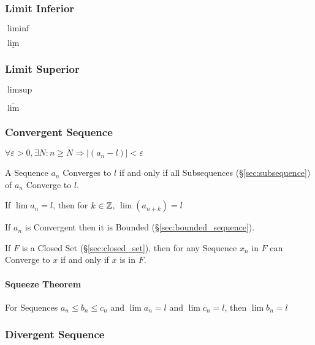 \subsubsection{Limit Inferior}\label{sec:liminf}

$\liminf$

$\underline{\lim}$



\subsubsection{Limit Superior}\label{sec:limsup}

$\limsup$

$\overline{\lim}$



\subsubsection{Convergent Sequence}\label{sec:convergent_sequence}

$\forall \varepsilon > 0, \exists N : n \geq N \Rightarrow |(a_n - l)| <
\varepsilon$

A Sequence $a_n$ Converges to $l$ if and only if all Subsequences
(\S\ref{sec:subsequence}) of $a_n$ Converge to $l$.

If $\lim a_n = l$, then for $k \in \mathbb{Z}$, $\lim (a_{n+k}) = l$

If $a_n$ is Convergent then it is Bounded
(\S\ref{sec:bounded_sequence}).

If $F$ is a Closed Set (\S\ref{sec:closed_set}), then for any Sequence
$x_n$ in $F$ can Converge to $x$ if and only if $x$ is in $F$.



\paragraph{Squeeze Theorem}\label{sec:squeeze_theorem}\hfill

For Sequences $a_n \leq b_n \leq c_n$ and $\lim a_n = l$ and $\lim c_n
= l$, then $\lim b_n = l$



\subsubsection{Divergent Sequence}\label{sec:divergent_sequence}



